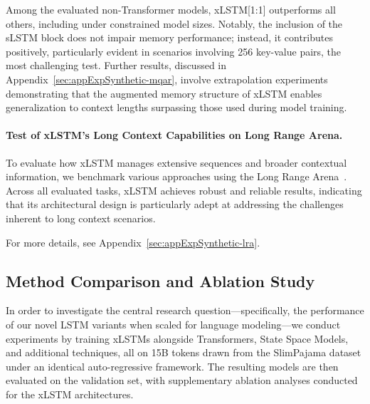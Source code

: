 Among the evaluated non-Transformer models, xLSTM[1:1] outperforms all others, including under constrained model sizes. Notably, the inclusion of the sLSTM block does not impair memory performance; instead, it contributes positively, particularly evident in scenarios involving 256 key-value pairs, the most challenging test. Further results, discussed in Appendix~\ref{sec:appExpSynthetic-mqar}, involve extrapolation experiments demonstrating that the augmented memory structure of xLSTM enables generalization to context lengths surpassing those used during model training.

\paragraph{Test of xLSTM's Long Context Capabilities on Long Range Arena.} To evaluate how xLSTM manages extensive sequences and broader contextual information, we benchmark various approaches using the Long Range Arena~\citep{Tay:21}. Across all evaluated tasks, xLSTM achieves robust and reliable results, indicating that its architectural design is particularly adept at addressing the challenges inherent to long context scenarios.

For more details, see Appendix~\ref{sec:appExpSynthetic-lra}.

\subsection{Method Comparison and Ablation Study}
\label{sec:ExpComparison}

In order to investigate the central research question—specifically, the performance of our novel LSTM variants when scaled for language modeling—we conduct experiments by training xLSTMs alongside Transformers, State Space Models, and additional techniques, all on 15B tokens drawn from the SlimPajama dataset under an identical auto-regressive framework. The resulting models are then evaluated on the validation set, with supplementary ablation analyses conducted for the xLSTM architectures.

